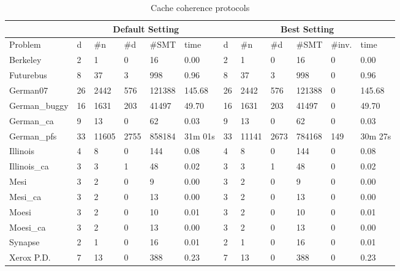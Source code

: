 \documentclass{LMCS}
\theoremstyle{plain}\newtheorem{assumption}[thm]{Assumption}
\theoremstyle{plain}\newtheorem{proposition}[thm]{Proposition}
\theoremstyle{plain}\newtheorem{property}[thm]{Property}
\theoremstyle{plain}\newtheorem{example}[thm]{Example}
\theoremstyle{plain}\newtheorem{claim}[thm]{Claim}
\theoremstyle{plain}\newtheorem{lemma}[thm]{Lemma}
\begin{document}
\begin{table}[t]
\small
\caption{\label{subapp:ccp}Cache coherence protocols}
\begin{tabular}{||l|l|l|l|l|l||l|l|l|l|l|l||}
\hline\hline
& \multicolumn{5}{|c||}{Default Setting} & 
  \multicolumn{6}{|c||}{Best Setting} \\ \hline
Problem  & d & \#n & \#d & \#SMT & time 
         & d & \#n & \#d & \#SMT & \#inv. & time \\ \hline\hline
Berkeley & 	2 & 	1 & 	0 & 	16 & 	0.00 
         & 	2 & 	1 & 	0 & 	16 & 	0 & 	0.00 \\ \hline
Futurebus & 	8 & 	37 & 	3 & 	998 & 	0.96 
          & 	8 & 	37 & 	3 & 	998 & 	0 & 	0.96 \\ \hline
German07 & 	26 & 	2442 & 	576 & 	121388 & 	145.68 
         & 	26 & 	2442 & 	576 & 	121388 & 	0 & 	145.68 \\ \hline
German\_buggy & 	16 & 	1631 & 	203 & 	41497 & 	49.70 
              & 	16 & 	1631 & 	203 & 	41497 & 	0 & 	49.70 \\ \hline
German\_ca & 	9 & 	13 & 	0 & 	62 & 	0.03 
           & 	9 & 	13 & 	0 & 	62 & 	0 & 	0.03 \\ \hline
German\_pfs & 	33 & 	11605 & 	2755 & 	858184 & 	31m 01s 
            & 	33 & 	11141 & 	2673 & 	784168 & 	149 & 	30m 27s \\ \hline
Illinois & 	4 & 	8 & 	0 & 	144 & 	0.08 
         & 	4 & 	8 & 	0 & 	144 & 	0 & 	0.08 \\ \hline
Illinois\_ca & 	3 & 	3 & 	1 & 	48 & 	0.02 
             & 	3 & 	3 & 	1 & 	48 & 	0 & 	0.02 \\ \hline
Mesi & 	3 & 	2 & 	0 & 	9 & 	0.00 
     & 	3 & 	2 & 	0 & 	9 & 	0 & 	0.00 \\ \hline
Mesi\_ca & 	3 & 	2 & 	0 & 	13 & 	0.00 
         & 	3 & 	2 & 	0 & 	13 & 	0 & 	0.00 \\ \hline
Moesi & 	3 & 	2 & 	0 & 	10 & 	0.01 
      & 	3 & 	2 & 	0 & 	10 & 	0 & 	0.01 \\ \hline
Moesi\_ca & 	3 & 	2 & 	0 & 	13 & 	0.00 
          & 	3 & 	2 & 	0 & 	13 & 	0 & 	0.00 \\ \hline
Synapse & 	2 & 	1 & 	0 & 	16 & 	0.01 
        & 	2 & 	1 & 	0 & 	16 & 	0 & 	0.01 \\ \hline
Xerox P.D. & 	7 & 	13 & 	0 & 	388 & 	0.23 
           & 	7 & 	13 & 	0 & 	388 & 	0 & 	0.23 \\ \hline\hline
\end{tabular}
\end{table}
\end{document}
